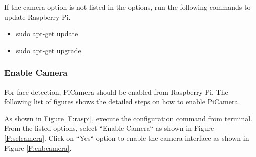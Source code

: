 \documentclass[sigconf]{acmart}
\begin{document}
If the camera option is not listed in the options, run the following commands to update Raspberry Pi.
\begin{itemize}
\item sudo apt-get update
\item sudo apt-get upgrade
\end{itemize}

\subsubsection{Enable Camera}
For face detection, PiCamera should be enabled from Raspberry Pi. The following list of figures shows the detailed steps on how to enable PiCamera.

As shown in Figure \ref{F:raspi}, execute the configuration command from terminal. From the listed options, select ``Enable Camera`` as shown in Figure \ref{F:selcamera}. Click on ``Yes`` option to enable the camera interface as shown in Figure \ref{F:enbcamera}.
\end{document}

